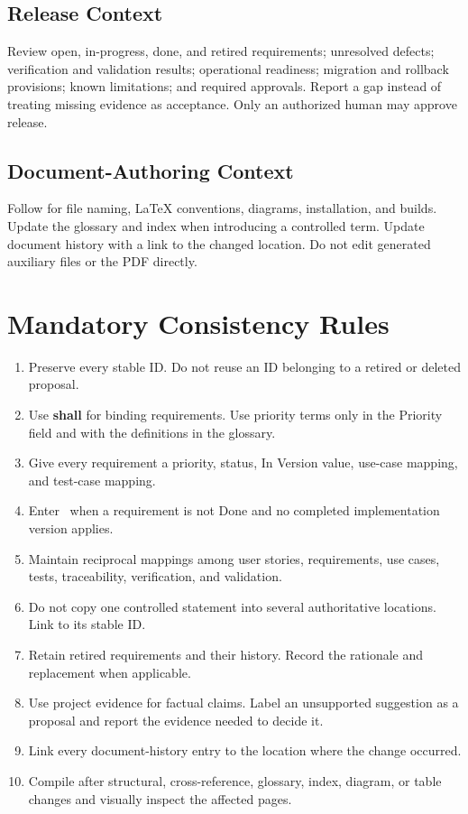 \subsection{Release Context}
Review open, in-progress, done, and retired requirements; unresolved defects;
verification and validation results; operational readiness; migration and
rollback provisions; known limitations; and required approvals. Report a gap
instead of treating missing evidence as acceptance. Only an authorized human
may approve release.

\subsection{Document-Authoring Context}
Follow  for file naming, LaTeX conventions, diagrams,
installation, and builds. Update the glossary and index when introducing a
controlled term. Update document history with a link to the changed location.
Do not edit generated auxiliary files or the PDF directly.

\section{Mandatory Consistency Rules}

\begin{enumerate}
\item Preserve every stable ID. Do not reuse an ID belonging to a retired or
deleted proposal.
\item Use \textbf{shall} for binding requirements. Use priority terms only in
the Priority field and with the definitions in the glossary.
\item Give every requirement a priority, status, In Version value, use-case
mapping, and test-case mapping.
\item Enter \NoVersion\ when a requirement is not Done and no completed
implementation version applies.
\item Maintain reciprocal mappings among user stories, requirements, use
cases, tests, traceability, verification, and validation.
\item Do not copy one controlled statement into several authoritative
locations. Link to its stable ID.
\item Retain retired requirements and their history. Record the rationale and
replacement when applicable.
\item Use project evidence for factual claims. Label an unsupported suggestion
as a proposal and report the evidence needed to decide it.
\item Link every document-history entry to the location where the change
occurred.
\item Compile after structural, cross-reference, glossary, index, diagram, or
table changes and visually inspect the affected pages.
\end{enumerate}

